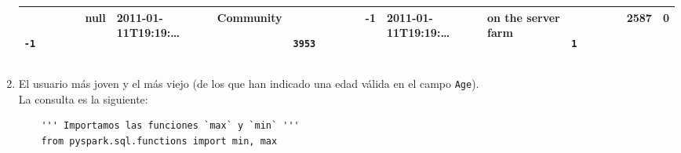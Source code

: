 \documentclass[12pt,a4paper,twoside,openright,titlepage,final]{article}
\begin{document}
\begin{enumerate}
\begin{longtable}[]{@{}lllllllllll@{}}
\begin{minipage}[t]{0.06\columnwidth}
\begin{verbatim}
			-1
			\end{verbatim}
			\strut\end{minipage} &
		\begin{minipage}[t]{0.03\columnwidth}\raggedright\strut
			null
			\strut\end{minipage} &
		\begin{minipage}[t]{0.12\columnwidth}\raggedright\strut
			2011-01-11T19:19:\ldots{}
			\strut\end{minipage} &
		\begin{minipage}[t]{0.07\columnwidth}\raggedright\strut
			Community
			\strut\end{minipage} &
		\begin{minipage}[t]{0.06\columnwidth}\raggedright\strut
			\begin{verbatim}
			3953
			\end{verbatim}
			\strut\end{minipage} &
		\begin{minipage}[t]{0.02\columnwidth}\raggedright\strut
			-1
			\strut\end{minipage} &
		\begin{minipage}[t]{0.12\columnwidth}\raggedright\strut
			2011-01-11T19:19:\ldots{}
			\strut\end{minipage} &
		\begin{minipage}[t]{0.11\columnwidth}\raggedright\strut
			on the server farm
			\strut\end{minipage} &
		\begin{minipage}[t]{0.06\columnwidth}\raggedright\strut
			\begin{verbatim}
			1
			\end{verbatim}
			\strut\end{minipage} &
		\begin{minipage}[t]{0.04\columnwidth}\raggedright\strut
			2587
			\strut\end{minipage} &
		\begin{minipage}[t]{0.04\columnwidth}\raggedright\strut
			0
			\strut\end{minipage}\tabularnewline
		\bottomrule
	\end{longtable}
	
	\item El usuario más joven y el más viejo (de los que han indicado una edad válida en el campo \texttt{Age}).\\
	
	La consulta es la siguiente:
	
	\begin{verbatim}
	''' Importamos las funciones `max` y `min` '''
	from pyspark.sql.functions import min, max
	

\end{verbatim}
\end{enumerate}
\end{document}
